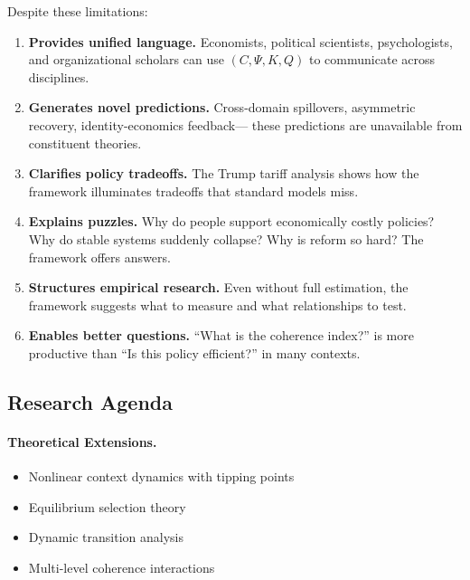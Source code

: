 Despite these limitations:

\begin{enumerate}
  \item \textbf{Provides unified language.}
        Economists, political scientists, psychologists, and organizational scholars
        can use $(C, \Psi, K, Q)$ to communicate across disciplines.
  
  \item \textbf{Generates novel predictions.}
        Cross-domain spillovers, asymmetric recovery, identity-economics feedback---
        these predictions are unavailable from constituent theories.
  
  \item \textbf{Clarifies policy tradeoffs.}
        The Trump tariff analysis shows how the framework illuminates
        tradeoffs that standard models miss.
  
  \item \textbf{Explains puzzles.}
        Why do people support economically costly policies?
        Why do stable systems suddenly collapse?
        Why is reform so hard? The framework offers answers.
  
  \item \textbf{Structures empirical research.}
        Even without full estimation, the framework suggests
        what to measure and what relationships to test.
  
  \item \textbf{Enables better questions.}
        ``What is the coherence index?'' is more productive than
        ``Is this policy efficient?'' in many contexts.
\end{enumerate}

\subsection{Research Agenda}

\paragraph{Theoretical Extensions.}
\begin{itemize}
  \item Nonlinear context dynamics with tipping points
  \item Equilibrium selection theory
  \item Dynamic transition analysis
  \item Multi-level coherence interactions
\end{itemize}


